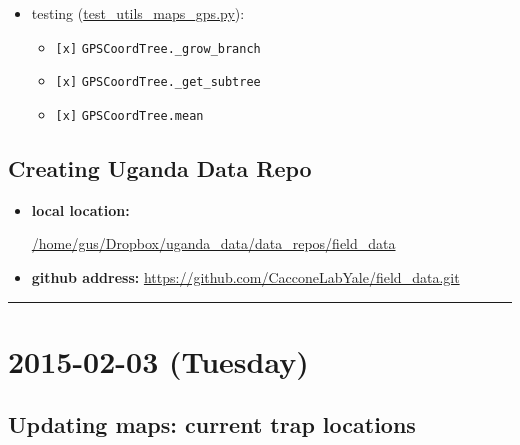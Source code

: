 \documentclass[letterpaper]{scrartcl}
\begin{document}
\begin{itemize}
\itemsep1pt\parskip0pt
\item
  testing
  (\href{file:///home/gus/Dropbox/repos/git/spartan/src/spartan/tests/test_utils_maps_gps.py}{test\_utils\_maps\_gps.py}):

  \begin{itemize}
  \itemsep1pt\parskip0pt
  \item
    \texttt{{[}x{]}} \texttt{GPSCoordTree.\_grow\_branch}
  \item
    \texttt{{[}x{]}} \texttt{GPSCoordTree.\_get\_subtree}
  \item
    \texttt{{[}x{]}} \texttt{GPSCoordTree.mean}
  \end{itemize}
\end{itemize}

\subsection{Creating Uganda Data Repo}\label{creating-uganda-data-repo}

\begin{itemize}
\item
  \textbf{local location:}

  \href{file:///home/gus/Dropbox/uganda_data/data_repos/field_data}{/home/gus/Dropbox/uganda\_data/data\_repos/field\_data}
\item
  \textbf{github address:}
  \url{https://github.com/CacconeLabYale/field_data.git}
\end{itemize}

\begin{center}\rule{0.5\linewidth}{\linethickness}\end{center}

\section{2015-02-03 (Tuesday)}\label{tuesday}

\subsection{Updating maps: current trap
locations}\label{updating-maps-current-trap-locations-2}
\end{document}
